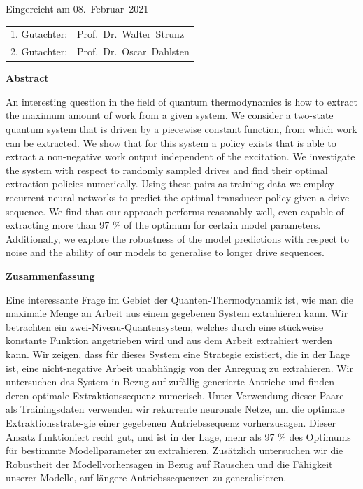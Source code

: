 \thispagestyle{empty}\vspace*{48em}

Eingereicht am 08.~Februar~2021\vspace{1.5em}
\par{\large\begin{tabular}{ll}
 1. Gutachter: & Prof.~Dr.~Walter~Strunz \\
 2. Gutachter: & Prof.~Dr.~Oscar~Dahlsten \\
\end{tabular}}


\newpage
\begin{center}\large\bfseries Abstract\end{center}
An interesting question in the field of quantum thermodynamics is how to extract the maximum amount of work from a given system.
We consider a two-state quantum system that is driven by a piecewise constant function, from which work can be extracted.
We show that for this system a policy exists that is able to extract a non-negative work output independent of the excitation.
We investigate the system with respect to randomly sampled drives and find their optimal extraction policies numerically.
Using these pairs as training data we employ recurrent neural networks to predict the optimal transducer policy given a drive sequence.
We find that our approach performs reasonably well, even capable of extracting more than 97 \% of the optimum for certain model parameters.
Additionally, we explore the robustness of the model predictions with respect to noise and the ability of our models to generalise to longer drive sequences.

\vspace{10em}
\begin{center}\large\bfseries Zusammenfassung\end{center}
Eine interessante Frage im Gebiet der Quanten-Thermodynamik ist, wie man die maximale Menge an Arbeit aus einem gegebenen System extrahieren kann.
Wir betrachten ein zwei-Niveau-Quantensystem, welches durch eine stückweise konstante Funktion angetrieben wird und aus dem Arbeit extrahiert werden kann.
Wir zeigen, dass für dieses System eine Strategie existiert, die in der Lage ist, eine nicht-negative Arbeit unabhängig von der Anregung zu extrahieren.
Wir untersuchen das System in Bezug auf zufällig generierte Antriebe und finden deren optimale Extraktionssequenz numerisch.
Unter Verwendung dieser Paare als Trainingsdaten verwenden wir rekurrente neuronale Netze, um die optimale Extraktionsstrate-gie einer gegebenen Antriebssequenz vorherzusagen.
Dieser Ansatz funktioniert recht gut, und ist in der Lage, mehr als 97 \% des Optimums für bestimmte Modellparameter zu extrahieren.
Zusätzlich untersuchen wir die Robustheit der Modellvorhersagen in Bezug auf Rauschen und die Fähigkeit unserer Modelle, auf längere Antriebssequenzen zu generalisieren.
 

